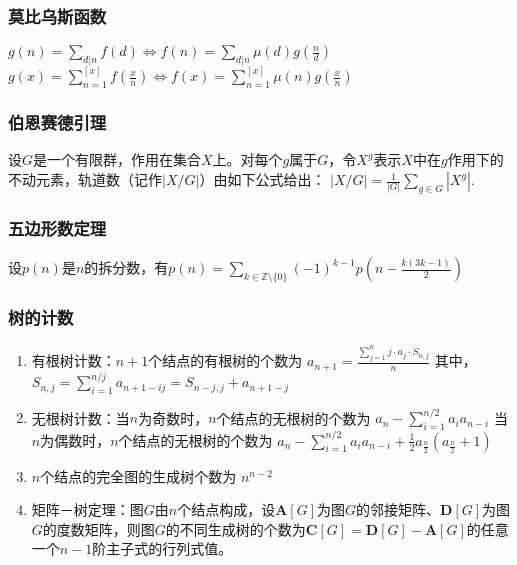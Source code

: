 \documentclass[landscape,twocolumn,a4paper]{article}
\begin{document}
	\subsubsection*{莫比乌斯函数}
	\iffalse
	$\mu(n) = \begin{cases}
	1 & \text{若}n=1\\
	(-1)^k & \text{若}n\text{无平方数因子，且}n = p_1p_2\dots p_k\\
	0 & \text{若}n\text{有大于}1\text{的平方数因数}
	\end{cases}$
	$\sum_{d|n}{\mu(d)} = \begin{cases}
	1 & \text{若}n=1\\
	0 & \text{其他情况}
	\end{cases}$
	\fi
	$g(n) = \sum_{d|n}{f(d)} \Leftrightarrow f(n) = \sum_{d|n}{\mu(d)g(\frac{n}{d})}$
	$g(x) = \sum_{n=1}^{[x]}f(\frac{x}{n}) \Leftrightarrow f(x) = \sum_{n=1}^{[x]}{\mu(n)g(\frac{x}{n})}$

	\subsubsection*{伯恩赛德引理}
	设$G$是一个有限群，作用在集合$X$上。对每个$g$属于$G$，令$X^g$表示$X$中在$g$作用下的不动元素，轨道数（记作$|X/G|$）由如下公式给出：
	$|X/G| = \frac{1}{|G|}\sum_{g \in G}|X^g|.\,$

	\subsubsection*{五边形数定理}

	设$p(n)$是$n$的拆分数，有$p(n) = \sum_{k \in \mathbb{Z} \setminus \{0\}} (-1)^{k - 1} p\left(n - \frac{k(3k - 1)}{2}\right)$

	\subsubsection*{树的计数}

	\begin{enumerate}
		\item 有根树计数：$n+1$个结点的有根树的个数为
		$a_{n+1} = \frac{\sum_{j=1}^{n}{j \cdot a_j \cdot{S_{n, j}}}}{n}$
		其中，
		$S_{n, j} = \sum_{i=1}^{n/j}{a_{n+1-ij}} = S_{n-j, j} + a_{n+1-j}$
		\item 无根树计数：当$n$为奇数时，$n$个结点的无根树的个数为
		$a_n-\sum_{i=1}^{n/2}{a_ia_{n-i}}$
		当$n$为偶数时，$n$个结点的无根树的个数为
		$a_n-\sum_{i=1}^{n/2}{a_ia_{n-i}}+\frac{1}{2}a_{\frac{n}{2}}(a_{\frac{n}{2}}+1)$
		\item $n$个结点的完全图的生成树个数为
		$n^{n-2}$
		\item 矩阵－树定理：图$G$由$n$个结点构成，设$\bm{A}[G]$为图$G$的邻接矩阵、$\bm{D}[G]$为图$G$的度数矩阵，则图$G$的不同生成树的个数为$\bm{C}[G] = \bm{D}[G] - \bm{A}[G]$的任意一个$n-1$阶主子式的行列式值。
	\end{enumerate}
\end{document}
